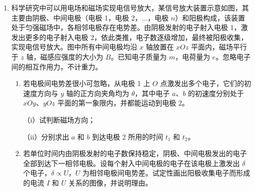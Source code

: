 \documentclass[\gkver]{gaokaozhenti}
\begin{document}
\begin{enumerate}

\item
科学研究中可以用电场和磁场实现电信号放大，某信号放大装置示意如图，其主要由阴极、中间电极（电极 1，电极 2，$\ldots$，电极 $n$）和阳极构成，该装置处于匀强磁场中，各相邻电极存在电势差。由阴极发射的电子射入电极 1，激发出更多的电子射入电极 2，依此类推，电子数逐级增加，最终被阳极收集，实现电信号放大。图中所有中间电极均沿 $x$ 轴放置在 $xOz$ 平面内，磁场平行于 $z$ 轴，磁感应强度的大小为 $B$。已知电子质量为 $m$，电荷量为 $e$。忽略电子间的相互作用力，不计重力。

\onepicture[w=8.50cm]{}

\begin{enumerate}
	\item
	若电极间电势差很小可忽略，从电极 1 上 $O$ 点激发出多个电子，它们的初速度方向与 $y$ 轴的正方向夹角均为 $\theta$，其中电子 $a$、$b$ 的初速度分别处于 $xOy$、$yOz$ 平面的第一象限内，并都能运动到电极 2。

	（i）试判断磁场方向；

	（ii）分别求出 $a$ 和 $b$ 到达电极 2 所用的时间 $t_{1}$ 和 $t_{2}$。
	\item
	若单位时间内由阴极发射的电子数保持稳定，阴极、中间电极发出的电子全部到达下一相邻电极。设每个射入中间电极的电子在该电极上激发出 $\delta$ 个电子，$\delta \propto U$，$U$ 为相邻电极间电势差。试定性画出阳极收集电子而形成的电流 $I$ 和 $U$ 关系的图像，并说明理由。
\end{enumerate}


\end{enumerate}
\end{document}
